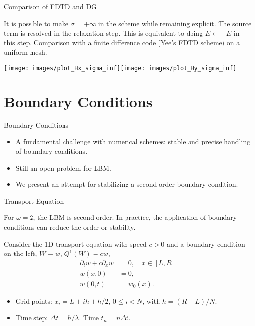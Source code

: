 \documentclass[english]{beamer}
\begin{document}
%
\begin{frame}{Comparison of FDTD and DG}

It is possible to make $\sigma=+\infty$ in the scheme while remaining explicit. The source term is resolved in the relaxation step. This is equivalent to doing $E\leftarrow-E$ in this step. Comparison with a finite difference code (Yee's FDTD scheme) on a uniform mesh.
\begin{center}
\texttt{[image: images/plot\_Hx\_sigma\_inf]}\texttt{[image: images/plot\_Hy\_sigma\_inf]}
\par\end{center}

\end{frame}
%
 \section{Boundary Conditions}
\begin{frame}{Boundary Conditions}

  \begin{itemize}
\item A fundamental challenge with numerical schemes: stable and precise handling of boundary conditions.
\item Still an open problem for LBM.
\item We present an attempt for stabilizing a second order boundary condition.
\end{itemize}
\end{frame}
%
\begin{frame}{Transport Equation}

For $\omega=2$, the LBM is second-order. In practice, the application of boundary conditions can reduce the order or stability.

Consider the 1D transport equation with speed $c>0$ and a boundary condition on the left, $W=w$, $Q^{1}(W)=cw$,
\begin{align*}
\partial_{t}w+c\partial_{x}w & =0,\quad x\in[L,R]\\
w(x,0) & =0,\\
w(0,t) & =w_{0}(x).
\end{align*}

\begin{itemize}
\item Grid points: $x_{i}=L+ih+h/2$, $0\leq i<N$, with $h=(R-L)/N$.
\item Time step: $\Delta t=h/\lambda$. Time $t_{n}=n\Delta t$.
\end{itemize}
\end{frame}
\end{document}
